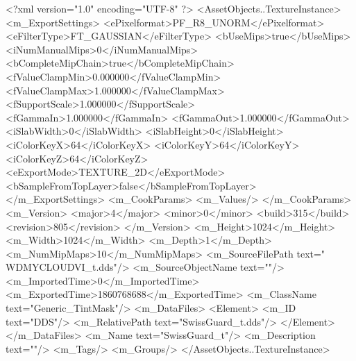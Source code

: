<?xml version="1.0" encoding="UTF-8" ?>
<AssetObjects..TextureInstance>
	<m_ExportSettings>
		<ePixelformat>PF_R8_UNORM</ePixelformat>
		<eFilterType>FT_GAUSSIAN</eFilterType>
		<bUseMips>true</bUseMips>
		<iNumManualMips>0</iNumManualMips>
		<bCompleteMipChain>true</bCompleteMipChain>
		<fValueClampMin>0.000000</fValueClampMin>
		<fValueClampMax>1.000000</fValueClampMax>
		<fSupportScale>1.000000</fSupportScale>
		<fGammaIn>1.000000</fGammaIn>
		<fGammaOut>1.000000</fGammaOut>
		<iSlabWidth>0</iSlabWidth>
		<iSlabHeight>0</iSlabHeight>
		<iColorKeyX>64</iColorKeyX>
		<iColorKeyY>64</iColorKeyY>
		<iColorKeyZ>64</iColorKeyZ>
		<eExportMode>TEXTURE_2D</eExportMode>
		<bSampleFromTopLayer>false</bSampleFromTopLayer>
	</m_ExportSettings>
	<m_CookParams>
		<m_Values/>
	</m_CookParams>
	<m_Version>
		<major>4</major>
		<minor>0</minor>
		<build>315</build>
		<revision>805</revision>
	</m_Version>
	<m_Height>1024</m_Height>
	<m_Width>1024</m_Width>
	<m_Depth>1</m_Depth>
	<m_NumMipMaps>10</m_NumMipMaps>
	<m_SourceFilePath text="\\WDMYCLOUD\Sam\Projects\Modding\Civ VI\Civilizations\Switzerland\Assets\Unit\SwissGuard_t.dds"/>
	<m_SourceObjectName text=""/>
	<m_ImportedTime>0</m_ImportedTime>
	<m_ExportedTime>1860768688</m_ExportedTime>
	<m_ClassName text="Generic_TintMask"/>
	<m_DataFiles>
		<Element>
			<m_ID text="DDS"/>
			<m_RelativePath text="SwissGuard_t.dds"/>
		</Element>
	</m_DataFiles>
	<m_Name text="SwissGuard_t"/>
	<m_Description text=""/>
	<m_Tags/>
	<m_Groups/>
</AssetObjects..TextureInstance>

